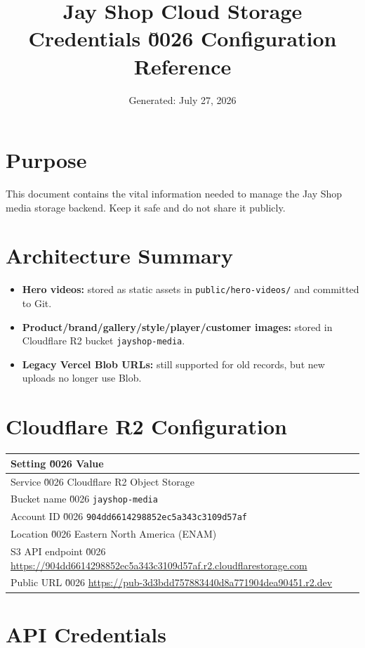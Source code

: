 \documentclass[10pt]{article}
\title{\textbf{Jay Shop Cloud Storage Credentials \u0026 Configuration Reference}}
\author{Generated: July 27, 2026}
\date{}
\begin{document}
\maketitle

\section*{Purpose}
This document contains the vital information needed to manage the Jay Shop media storage backend. Keep it safe and do not share it publicly.

\section*{Architecture Summary}

\begin{itemize}[leftmargin=*]
  \item \textbf{Hero videos:} stored as static assets in \texttt{public/hero-videos/} and committed to Git.
  \item \textbf{Product/brand/gallery/style/player/customer images:} stored in Cloudflare R2 bucket \texttt{jayshop-media}.
  \item \textbf{Legacy Vercel Blob URLs:} still supported for old records, but new uploads no longer use Blob.
\end{itemize}

\section*{Cloudflare R2 Configuration}

\begin{longtable}{p{3.8cm} p{10.5cm}}
\toprule
\textbf{Setting} \u0026 \textbf{Value} \\
\midrule
\endhead
Service \u0026 Cloudflare R2 Object Storage \\
Bucket name \u0026 \texttt{jayshop-media} \\
Account ID \u0026 \texttt{904dd6614298852ec5a343c3109d57af} \\
Location \u0026 Eastern North America (ENAM) \\
S3 API endpoint \u0026 \url{https://904dd6614298852ec5a343c3109d57af.r2.cloudflarestorage.com} \\
Public URL \u0026 \url{https://pub-3d3bdd757883440d8a771904dea90451.r2.dev} \\
\bottomrule
\end{longtable}

\section*{API Credentials}
\end{document}
